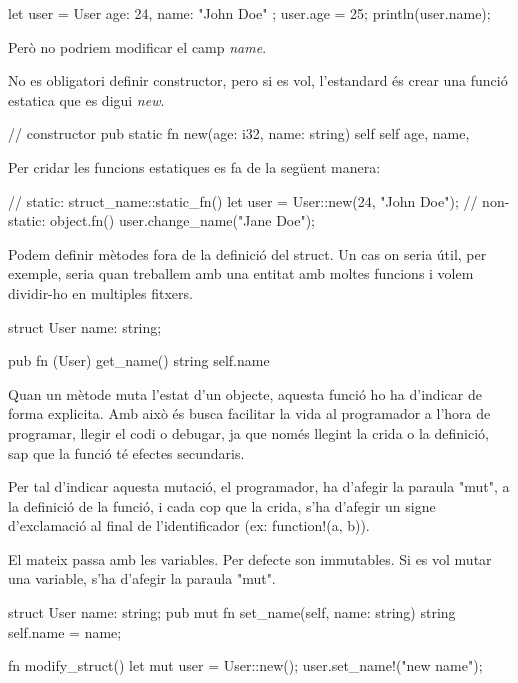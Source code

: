 ﻿\documentclass{article}
\begin{document}
\begin{code}
let user = User { age: 24, name: "John Doe" };
user.age = 25;
println(user.name);
\end{code}

Però no podriem modificar el camp \textit{name}.

No es obligatori definir constructor, pero si es vol, l'estandard és crear una
funció estatica que es digui \textit{new}.

\begin{code}
// constructor
pub static fn new(age: i32, name: string) self {
    self {
        age,
        name,
    }
}
\end{code}

Per cridar les funcions estatiques es fa de la següent manera:

\begin{code}
// static: struct_name::static_fn()
let user = User::new(24, "John Doe");
// non-static: object.fn()
user.change_name("Jane Doe");
\end{code}

Podem definir mètodes fora de la definició del struct. Un cas on seria útil,
per exemple, seria quan treballem amb una entitat amb moltes funcions i volem 
dividir-ho en multiples fitxers.

\begin{code}
struct User {
    name: string;
}

pub fn (User) get_name() string {
    self.name
}
\end{code}

Quan un mètode muta l'estat d'un objecte, aquesta funció ho ha d'indicar de forma
explicita. Amb això és busca facilitar la vida al programador a l'hora de programar, 
llegir el codi o debugar, ja que només llegint la crida o la definició, sap que
la funció té efectes secundaris.

Per tal d'indicar aquesta mutació, el programador, ha d'afegir la paraula "mut",
a la definició de la funció, i cada cop que la crida, s'ha d'afegir un signe 
d'exclamació al final de l'identificador (ex: {\ttfamily function!(a, b)}).

El mateix passa amb les variables. Per defecte son immutables. Si es vol mutar 
una variable, s'ha d'afegir la paraula "mut".

\begin{code}
struct User {
    name: string;
    pub mut fn set_name(self, name: string) string {
        self.name = name;
    }
}

fn modify_struct() {
    let mut user = User::new();
    user.set_name!("new name");
}
\end{code}
\end{document}
